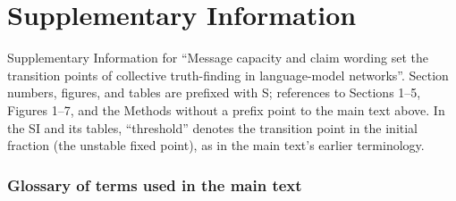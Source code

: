 \documentclass[11pt]{article}
\begin{document}



\clearpage
\setcounter{section}{0}
\setcounter{figure}{0}
\setcounter{table}{0}
\setcounter{equation}{0}
\renewcommand{\thesection}{S\arabic{section}}
\renewcommand{\thefigure}{S\arabic{figure}}
\renewcommand{\thetable}{S\arabic{table}}
\renewcommand{\theequation}{S\arabic{equation}}
\part*{Supplementary Information}
\noindent Supplementary Information for ``Message capacity and claim wording set the transition points of collective truth-finding in language-model networks''. Section numbers, figures, and tables are prefixed with S; references to Sections 1--5, Figures 1--7, and the Methods without a prefix point to the main text above. In the SI and its tables, ``threshold'' denotes the
transition point in the initial fraction (the unstable fixed point), as in the
main text's earlier terminology.


\section{Glossary of terms used in the main text}
\end{document}
